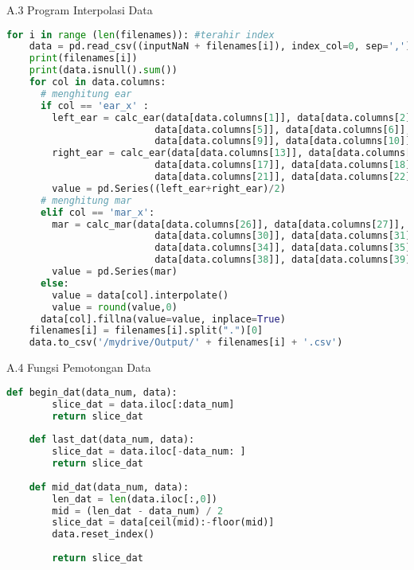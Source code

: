 A.3 Program Interpolasi Data
\begin{lstlisting}[language=Python]
    for i in range (len(filenames)): #terahir index 
    data = pd.read_csv((inputNaN + filenames[i]), index_col=0, sep=',') 
    print(filenames[i])
    print(data.isnull().sum())
    for col in data.columns:
      # menghitung ear
      if col == 'ear_x' :
        left_ear = calc_ear(data[data.columns[1]], data[data.columns[2]], data[data.columns[3]], data[data.columns[4]],
                          data[data.columns[5]], data[data.columns[6]], data[data.columns[7]], data[data.columns[8]],
                          data[data.columns[9]], data[data.columns[10]], data[data.columns[11]], data[data.columns[12]])
        right_ear = calc_ear(data[data.columns[13]], data[data.columns[14]], data[data.columns[15]], data[data.columns[16]],
                          data[data.columns[17]], data[data.columns[18]], data[data.columns[19]], data[data.columns[20]],
                          data[data.columns[21]], data[data.columns[22]], data[data.columns[23]], data[data.columns[24]])
        value = pd.Series((left_ear+right_ear)/2)
      # menghitung mar
      elif col == 'mar_x':
        mar = calc_mar(data[data.columns[26]], data[data.columns[27]], data[data.columns[28]], data[data.columns[29]],
                          data[data.columns[30]], data[data.columns[31]], data[data.columns[32]], data[data.columns[33]],
                          data[data.columns[34]], data[data.columns[35]], data[data.columns[36]], data[data.columns[37]],
                          data[data.columns[38]], data[data.columns[39]], data[data.columns[40]], data[data.columns[41]])
        value = pd.Series(mar)
      else:
        value = data[col].interpolate() 
        value = round(value,0)
      data[col].fillna(value=value, inplace=True)
    filenames[i] = filenames[i].split(".")[0]
    data.to_csv('/mydrive/Output/' + filenames[i] + '.csv')
\end{lstlisting}

A.4 Fungsi Pemotongan Data
\begin{lstlisting}[language=Python]
    def begin_dat(data_num, data):
        slice_dat = data.iloc[:data_num]
        return slice_dat
  
    def last_dat(data_num, data):
        slice_dat = data.iloc[-data_num: ]
        return slice_dat
  
    def mid_dat(data_num, data):
        len_dat = len(data.iloc[:,0])
        mid = (len_dat - data_num) / 2
        slice_dat = data[ceil(mid):-floor(mid)]
        data.reset_index()
  
        return slice_dat
\end{lstlisting}

